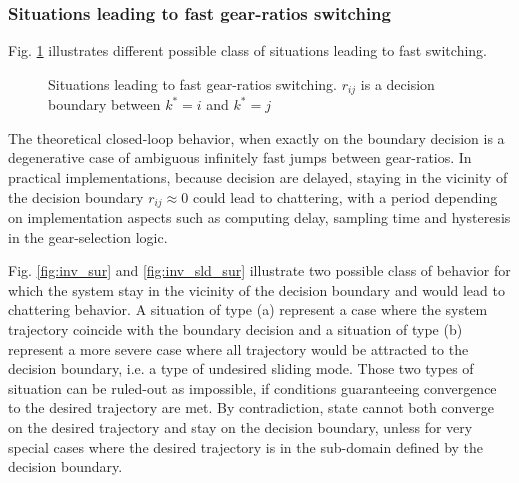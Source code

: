 \subsubsection{Situations leading to fast gear-ratios switching}

Fig. \ref{fig:chatsit} illustrates different possible class of situations leading to fast switching.
%
\begin{figure}[t]
        \centering
				\hspace{+3pt}
				\hspace{+3pt}
        \caption[Situations leading to fast gear-ratios switching]{Situations leading to fast gear-ratios switching. $r_{ij}$ is a decision boundary between $k^*=i$ and $k^*=j$ }\label{fig:chatsit}
\end{figure}


The theoretical closed-loop behavior, when exactly on the boundary decision is a degenerative case of ambiguous infinitely fast jumps between gear-ratios. In practical implementations, because decision are delayed, staying in the vicinity of the decision boundary $r_{ij} \approx 0 $ could lead to chattering, with a period depending on implementation aspects such as computing delay, sampling time and hysteresis in the gear-selection logic. 

Fig. \ref{fig:inv_sur} and \ref{fig:inv_sld_sur} illustrate two possible class of behavior for which the system stay in the vicinity of the decision boundary and would lead to chattering behavior. A situation of type (a) represent a case where the system trajectory coincide with the boundary decision and a situation of type (b) represent a more severe case where all trajectory would be attracted to the decision boundary, i.e. a type of undesired sliding mode. Those two types of situation can be ruled-out as impossible, if conditions guaranteeing convergence to the desired trajectory are met. By contradiction, state cannot both converge on the desired trajectory and stay on the decision boundary, unless for very special cases where the desired trajectory is in the sub-domain defined by the decision boundary. 

